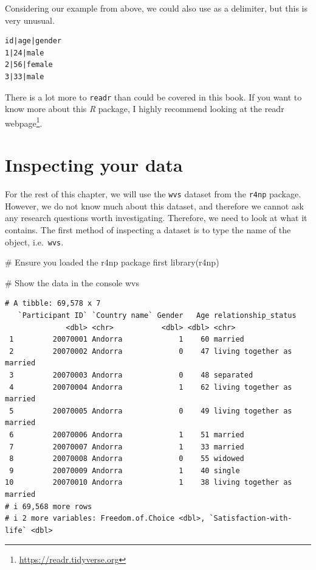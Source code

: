 \documentclass[
  letterpaper,
]{krantz}
\makeatletter
\newenvironment{Shaded}{\begin{snugshade}}{\end{snugshade}}
\newcommand{\CommentTok}[1]{\textcolor[rgb]{0.37,0.37,0.37}{#1}}
\newcommand{\FunctionTok}[1]{\textcolor[rgb]{0.28,0.35,0.67}{#1}}
\newcommand{\NormalTok}[1]{\textcolor[rgb]{0.00,0.23,0.31}{#1}}
\renewcommand{\href}[2]{#2\footnote{\url{#1}}}
\newenvironment{kframe}{%
\medskip{}
\setlength{\fboxsep}{.8em}
 \def\at@end@of@kframe{}%
 \ifinner\ifhmode%
  \def\at@end@of@kframe{\end{minipage}}%
  \begin{minipage}{\columnwidth}%
 \fi\fi%
 \def\FrameCommand##1{\hskip\@totalleftmargin \hskip-\fboxsep
 \colorbox{shadecolor}{##1}\hskip-\fboxsep
     \hskip-\linewidth \hskip-\@totalleftmargin \hskip\columnwidth}%
 \MakeFramed {\advance\hsize-\width
   \@totalleftmargin\z@ \linewidth\hsize
   \@setminipage}}%
 {\par\unskip\endMakeFramed%
 \at@end@of@kframe}
\renewenvironment{Shaded}{\begin{kframe}}{\end{kframe}}
\makeatother
\begin{document}
Considering our example from above, we could also use
\texttt{\textbar{}} as a delimiter, but this is very unusual.

\begin{verbatim}
id|age|gender
1|24|male
2|56|female
3|33|male
\end{verbatim}

There is a lot more to \texttt{readr} than could be covered in this
book. If you want to know more about this \emph{R} package, I highly
recommend looking at the \href{https://readr.tidyverse.org}{readr
webpage}.

\section{Inspecting your data}\label{sec-inspecting-raw-data}

For the rest of this chapter, we will use the \texttt{wvs} dataset from
the \texttt{r4np} package. However, we do not know much about this
dataset, and therefore we cannot ask any research questions worth
investigating. Therefore, we need to look at what it contains. The first
method of inspecting a dataset is to type the name of the object,
i.e.~\texttt{wvs}.

\begin{Shaded}
\begin{Highlighting}[]
\CommentTok{\# Ensure you loaded the \textquotesingle{}r4np\textquotesingle{} package first}
\FunctionTok{library}\NormalTok{(r4np)}

\CommentTok{\# Show the data in the console}
\NormalTok{wvs}
\end{Highlighting}
\end{Shaded}

\begin{verbatim}
# A tibble: 69,578 x 7
   `Participant ID` `Country name` Gender   Age relationship_status       
              <dbl> <chr>           <dbl> <dbl> <chr>                     
 1         20070001 Andorra             1    60 married                   
 2         20070002 Andorra             0    47 living together as married
 3         20070003 Andorra             0    48 separated                 
 4         20070004 Andorra             1    62 living together as married
 5         20070005 Andorra             0    49 living together as married
 6         20070006 Andorra             1    51 married                   
 7         20070007 Andorra             1    33 married                   
 8         20070008 Andorra             0    55 widowed                   
 9         20070009 Andorra             1    40 single                    
10         20070010 Andorra             1    38 living together as married
# i 69,568 more rows
# i 2 more variables: Freedom.of.Choice <dbl>, `Satisfaction-with-life` <dbl>
\end{verbatim}
\end{document}

